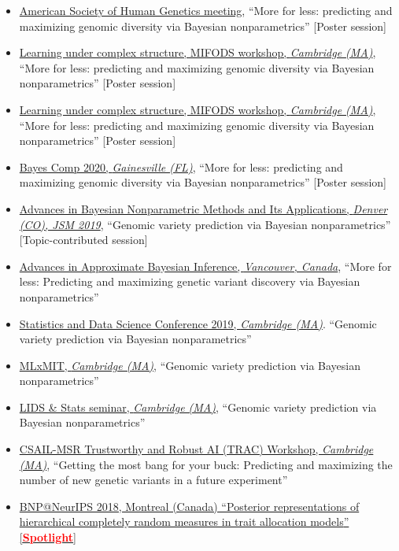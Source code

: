 \documentclass[10pt, a4paper]{article}
\newcommand{\years}[1]{\marginnote{\scriptsize #1}}
\begin{document}
\begin{itemize}
 	\item \href{https://www.ashg.org/meetings/2020meeting}{American Society of Human Genetics meeting}, ``{More for less: predicting and maximizing genomic diversity via Bayesian nonparametrics}'' [Poster session] 
	\item \href{http://mifods.mit.edu/complex.php}{Learning under complex structure, MIFODS workshop, \emph{Cambridge (MA)}}, ``{More for less: predicting and maximizing genomic diversity via Bayesian nonparametrics}'' [Poster session] 
	\item \href{http://mifods.mit.edu/complex.php}{Learning under complex structure, MIFODS workshop, \emph{Cambridge (MA)}}, ``{More for less: predicting and maximizing genomic diversity via Bayesian nonparametrics}'' [Poster session] 
	\item \href{http://users.stat.ufl.edu/~jhobert/BayesComp2020/Conf_Website/}{Bayes Comp 2020, \emph{Gainesville (FL)}}, ``{More for less: predicting and maximizing genomic diversity via Bayesian nonparametrics}'' [Poster session] 
\end{itemize}
\years{2019} 
\begin{itemize} 
	\item \href{https://ww2.amstat.org/meetings/jsm/2019/onlineprogram/AbstractDetails.cfm?abstractid=304376}{Advances in Bayesian Nonparametric Methods and Its Applications, \emph{Denver (CO), JSM 2019}}, ``{Genomic variety prediction via Bayesian nonparametrics}'' [Topic-contributed session] 
	\item \href{https://ww2.amstat.org/meetings/jsm/2019/onlineprogram/AbstractDetails.cfm?abstractid=304376}{Advances in Approximate  Bayesian Inference, \emph{Vancouver, Canada}}, ``{More for less: Predicting and maximizing genetic variant discovery via Bayesian nonparametrics}'' 
	\item \href{https://sdsc2019.mit.edu/agenda/}{Statistics and Data Science Conference 2019, \emph{Cambridge (MA)}}. ``{Genomic variety prediction via Bayesian nonparametrics}'' 
	\item \href{https://mlxmit.mit.edu/ml-tea-talks}{MLxMIT, \emph{Cambridge (MA)}}, ``{Genomic variety prediction via Bayesian nonparametrics}''  
	\item \href{https://lids.mit.edu/news-and-events/events/lids-stats-tea-talk-tbd-0}{LIDS \& Stats seminar, \emph{Cambridge (MA)}}, ``{Genomic variety prediction via Bayesian nonparametrics}'' 
	\item \href{http://gradientscience.org/trac_workshop/}{CSAIL-MSR Trustworthy and Robust AI (TRAC) Workshop, \emph{Cambridge (MA)}}, ``{Getting the most bang for your buck: Predicting and maximizing the number of new genetic variants in a future experiment}'' 
\end{itemize}
\years{2018} 
\begin{itemize}
\item \href{https://sites.google.com/view/nipsbnp2018/accepted-papers}{BNP@NeurIPS 2018, Montreal (Canada) ``{Posterior representations of hierarchical completely random measures in trait allocation models}''  [\textcolor{red}{\textbf{Spotlight}}}]
\end{itemize}
\end{document}
